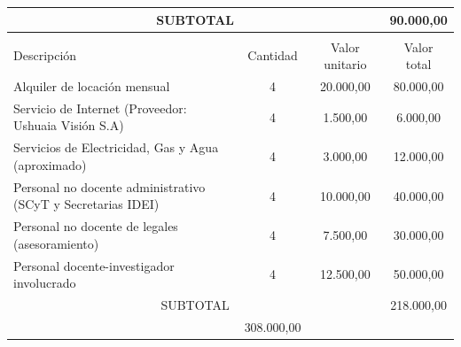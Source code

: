 \documentclass[11pt]{charter}
\begin{document}
\begin{table}[htpb]
\begin{tabularx}{\linewidth}{@{}|X|c|r|r|@{}}
\multicolumn{3}{|c|}{SUBTOTAL} &
  \multicolumn{1}{c|}{90.000,00} \\ \hline
\rowcolor[HTML]{C0C0C0} 
\multicolumn{4}{|c|}{\cellcolor[HTML]{C0C0C0}COSTOS INDIRECTOS} \\ \hline
\rowcolor[HTML]{C0C0C0} 
Descripción &
  \multicolumn{1}{c|}{\cellcolor[HTML]{C0C0C0}Cantidad} &
  \multicolumn{1}{c|}{\cellcolor[HTML]{C0C0C0}Valor unitario} &
  \multicolumn{1}{c|}{\cellcolor[HTML]{C0C0C0}Valor total} \\ \hline

 Alquiler de locación mensual &
  \multicolumn{1}{c|}{ 4 } &
  \multicolumn{1}{c|}{ 20.000,00 } &
  \multicolumn{1}{c|}{ 80.000,00 } \\ \hline
  
 Servicio de Internet (Proveedor: Ushuaia Visión S.A) &
  \multicolumn{1}{c|}{ 4 } &
  \multicolumn{1}{c|}{ 1.500,00 } &
  \multicolumn{1}{c|}{ 6.000,00 } \\ \hline  

 Servicios de Electricidad, Gas y Agua (aproximado) &
  \multicolumn{1}{c|}{ 4 } &
  \multicolumn{1}{c|}{ 3.000,00 } &
  \multicolumn{1}{c|}{ 12.000,00 } \\ \hline  
  
 Personal no docente administrativo (SCyT y Secretarias IDEI)  &
  \multicolumn{1}{c|}{ 4 } &
  \multicolumn{1}{c|}{ 10.000,00 } &
  \multicolumn{1}{c|}{ 40.000,00 } \\ \hline
  
 Personal no docente de legales (asesoramiento) &
  \multicolumn{1}{c|}{ 4 } &
  \multicolumn{1}{c|}{ 7.500,00 } &
  \multicolumn{1}{c|}{ 30.000,00 } \\ \hline
   
 Personal docente-investigador involucrado &
  \multicolumn{1}{c|}{ 4 } &
  \multicolumn{1}{c|}{ 12.500,00 } &
  \multicolumn{1}{c|}{ 50.000,00 } \\ \hline
  
\multicolumn{3}{|c|}{SUBTOTAL} &
  \multicolumn{1}{c|}{ 218.000,00 } \\ \hline
\rowcolor[HTML]{C0C0C0}
\multicolumn{3}{|c|}{TOTAL} & 308.000,00
   \\ \hline
\end{tabularx}%
\end{table}

\pagebreak
\end{document}
